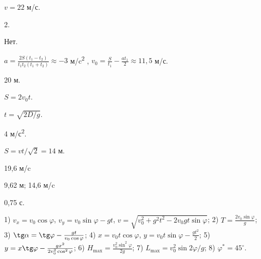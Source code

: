 \begin{Answer}{1}
$v = 22$ м/с.
\end{Answer}
\begin{Answer}{2}
\end{Answer}
\begin{Answer}{3}
2.
\end{Answer}
\begin{Answer}{4}
Нет.
\end{Answer}
\begin{Answer}{5}
$a = \frac{2S\left(t_1-t_2\right)}{t_1t_2\left(t_1+t_2\right)} \approx -3$ м/c\textsuperscript{2} , $v_0 = \frac{S}{t_1}-\frac{at_1}{2} \approx 11,5$ м/с.
\end{Answer}
\begin{Answer}{6}
\end{Answer}
\begin{Answer}{7}
20 м.
\end{Answer}
\begin{Answer}{8}
$S = 2 v_0 t$.
\end{Answer}
\begin{Answer}{9}
$t = \sqrt{2D/g}$.
\end{Answer}
\begin{Answer}{10}
\end{Answer}
\begin{Answer}{11}
4 м/с\textsuperscript{2}.
\end{Answer}
\begin{Answer}{12}
$S = vt/\sqrt{2} = 14$ м.
\end{Answer}
\begin{Answer}{13}
\end{Answer}
\begin{Answer}{14}
19,6 м/c
\end{Answer}
\begin{Answer}{15}
9,62 м; 14,6 м/c
\end{Answer}
\begin{Answer}{16}
0,75 с.
\end{Answer}
\begin{Answer}{17}
1) $v_x = v_0 \cos \varphi$, $v_y = v_0 \sin \varphi - gt$, $v = \sqrt{v_{0}^{2} + g^2 t^2 - 2v_{0}gt \sin \varphi}$; 2) $T = \frac{2v_{0}\sin \varphi}{g}$; 3) $ \tg \alpha = \tg \varphi - \frac{gt}{v_0 \cos \varphi}$; 4) $x = v_0 t \cos \varphi$, $y = v_0 t \sin \varphi - \frac{gt^2}{2}$; 5) $y = x \tg \varphi - \frac{gx^2}{2v_{0}^{2} \cos^2 \varphi} $; 6) $H_{\max} = \frac{v_{0}^{2} \sin^2 \varphi}{2g}$; 7) $L_{\max} = v_{0}^2 \sin 2 \varphi / g$; 8) $\varphi^{*} = 45^{\circ}$.
\end{Answer}
